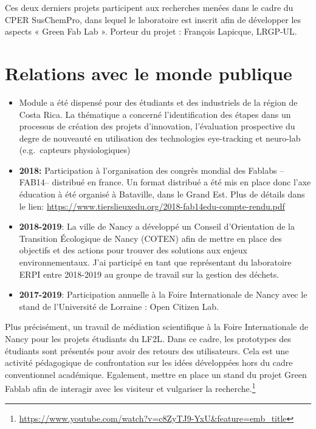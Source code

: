 \documentclass[
  12pt,
  oneside]{book}
\begin{document}
Ces deux derniers projets participent aux recherches menées dans le cadre du CPER SusChemPro, dans lequel le laboratoire est inscrit afin de développer les aspects « Green Fab Lab ». Porteur du projet : François Lapicque, LRGP-UL.

\hypertarget{relations-avec-le-monde-publique}{%
\section{Relations avec le monde publique}\label{relations-avec-le-monde-publique}}

\begin{itemize}
\item
  Module a été dispensé pour des étudiants et des industriels de la région de Costa Rica.
  La thématique a concerné l'identification des étapes dans un processus de création des projets d'innovation, l'évaluation prospective du degre de nouveauté en utilisation des technologies eye-tracking et neuro-lab (e.g.~capteurs physiologiques)
\item
  \textbf{2018:} Participation à l'organisation des congrès mondial des Fablabs --FAB14-- distribué en france. Un format distribué a été mis en place donc l'axe éducation à été organisé à Bataville, dans le Grand Est.
  Plus de détails dans le lien: \url{https://www.tierslieuxedu.org/2018-fab14edu-compte-rendu.pdf}
\item
  \textbf{2018-2019}: La ville de Nancy a développé un Conseil d'Orientation de la Transition Écologique de Nancy (COTEN) afin de mettre en place des objectifs et des actions pour trouver des solutions aux enjeux environnementaux.
  J'ai participé en tant que représentant du laboratoire ERPI entre 2018-2019 au groupe de travail sur la gestion des déchets.
\item
  \textbf{2017-2019}: Participation annuelle à la Foire Internationale de Nancy avec le stand de l'Université de Lorraine : Open Citizen Lab.
\end{itemize}

Plus précisément, un travail de médiation scientifique à la Foire Internationale de Nancy pour les projets étudiants du LF2L. Dans ce cadre, les prototypes des étudiants sont présentés pour avoir des retours des utilisateurs. Cela est une activité pédagogique de confrontation sur les idées développées hors du cadre conventionnel académique.
Egalement, mettre en place un stand du projet Green Fablab afin de interagir avec les visiteur et vulgariser la recherche.\footnote{\url{https://www.youtube.com/watch?v=c8ZyTJ9-YxU&feature=emb_title}}
\end{document}

